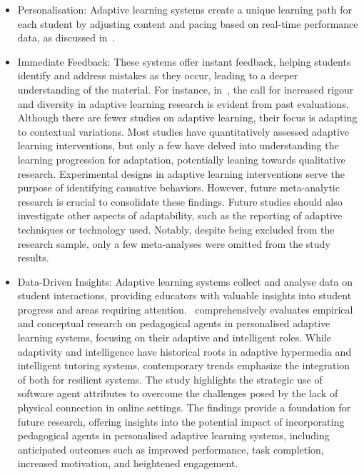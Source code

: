\begin{itemize}
    \item Personalisation: Adaptive learning systems create a unique learning path for each student by adjusting content and pacing based on real-time performance data, as discussed in~\citet{ElSabagh2021}.
    
    \item Immediate Feedback: These systems offer instant feedback, helping students identify and address mistakes as they occur, leading to a deeper understanding of the material. For instance, in~\citet{munoz2022systematic}, the call for increased rigour and diversity in adaptive learning research is evident from past evaluations. Although there are fewer studies on adaptive learning, their focus is adapting to contextual variations. Most studies have quantitatively assessed adaptive learning interventions, but only a few have delved into understanding the learning progression for adaptation, potentially leaning towards qualitative research. Experimental designs in adaptive learning interventions serve the purpose of identifying causative behaviors. However, future meta-analytic research is crucial to consolidate these findings. Future studies should also investigate other aspects of adaptability, such as the reporting of adaptive techniques or technology used. Notably, despite being excluded from the research sample, only a few meta-analyses were omitted from the study results.
    
    \item Data-Driven Insights: Adaptive learning systems collect and analyse data on student interactions, providing educators with valuable insights into student progress and areas requiring attention.~\citet{Apoki2022} comprehensively evaluates empirical and conceptual research on pedagogical agents in personalised adaptive learning systems, focusing on their adaptive and intelligent roles. While adaptivity and intelligence have historical roots in adaptive hypermedia and intelligent tutoring systems, contemporary trends emphasize the integration of both for resilient systems. The study highlights the strategic use of software agent attributes to overcome the challenges posed by the lack of physical connection in online settings. The findings provide a foundation for future research, offering insights into the potential impact of incorporating pedagogical agents in personalised adaptive learning systems, including anticipated outcomes such as improved performance, task completion, increased motivation, and heightened engagement.
\end{itemize}

